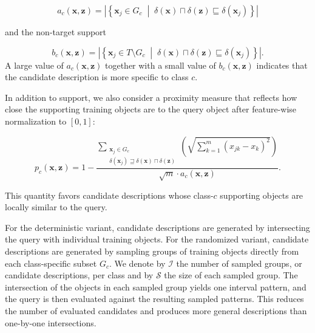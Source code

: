 \documentclass[a4paper,fleqn]{cas-sc}
\begin{document}
\begin{equation}
    a_c(\mathbf{x},\mathbf{z}) =
    \left|\left\{
    \mathbf{x}_j \in G_c
    \;\middle|\;
    \delta(\mathbf{x}) \sqcap \delta(\mathbf{z})
    \sqsubseteq \delta(\mathbf{x}_j)
    \right\}\right| 
\end{equation}

and the non-target support

\begin{equation}
    b_c(\mathbf{x},\mathbf{z}) =
    \left|\left\{
    \mathbf{x}_j \in T \setminus G_c
    \;\middle|\;
    \delta(\mathbf{x}) \sqcap \delta(\mathbf{z})
    \sqsubseteq \delta(\mathbf{x}_j)
    \right\}\right| .
\end{equation}
A large value of $a_c(\mathbf{x},\mathbf{z})$ together with a small value of $b_c(\mathbf{x},\mathbf{z})$ indicates that the candidate description is more specific to class $c$.

In addition to support, we also consider a proximity measure that reflects how close the supporting training objects are to the query object after feature-wise normalization to \([0,1]\):


\begin{equation}
    p_c(\mathbf{x},\mathbf{z}) =
    1 -
    \frac{
    \sum\limits_{\substack{
    \mathbf{x}_j \in G_c\\
    \delta(\mathbf{x}_j) \sqsupseteq \delta(\mathbf{x}) \sqcap \delta(\mathbf{z})
    }}
    \left(
    \sqrt{\sum\limits_{k=1}^{m}(x_{jk}-x_k)^2}
    \right)
    }
    {
    \sqrt{m}\cdot a_c(\mathbf{x},\mathbf{z})
    } .
\end{equation}


This quantity favors candidate descriptions whose class-$c$ supporting objects are locally similar to the query.

For the deterministic variant, candidate descriptions are generated by intersecting the query with individual training objects. For the randomized variant, candidate descriptions are generated by sampling groups of training objects directly from each class-specific subset \(G_c\). We denote by \(\mathcal{I}\) the number of sampled groups, or candidate descriptions, per class and by \(\mathcal{S}\) the size of each sampled group. The intersection of the objects in each sampled group yields one interval pattern, and the query is then evaluated against the resulting sampled patterns. This reduces the number of evaluated candidates and produces more general descriptions than one-by-one intersections.
\end{document}
